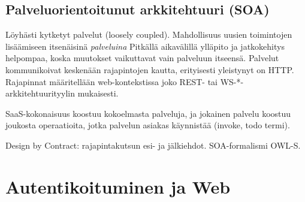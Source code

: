 \documentclass[finnish,gradu]{tktltiki}
\begin{document}





  \subsection{Palveluorientoitunut arkkitehtuuri (SOA)} %
  \label{sub:arkkitehtuurityyli_soa}

  Löyhästi kytketyt palvelut (loosely coupled).
  Mahdollisuus uusien toimintojen lisäämiseen itsenäisinä \emph{palveluina}
  Pitkällä aikavälillä ylläpito ja jatkokehitys helpompaa, koska muutokset vaikuttavat vain palveluun itseensä.
  Palvelut kommunikoivat keskenään rajapintojen kautta, erityisesti yleistynyt on HTTP.
  Rajapinnat määritellään web-kontekstissa joko REST- tai WS-*-arkkitehtuurityylin mukaisesti.

  SaaS-kokonaisuus koostuu kokoelmasta palveluja, ja jokainen palvelu koostuu joukosta operaatioita, jotka palvelun asiakas käynnistää (invoke, todo termi).

  Design by Contract: rajapintakutsun esi- ja jälkiehdot. SOA-formalismi OWL-S.





\section{Autentikoituminen ja Web} %
\label{sec:autentikoituminen_ja_web}
\end{document}
